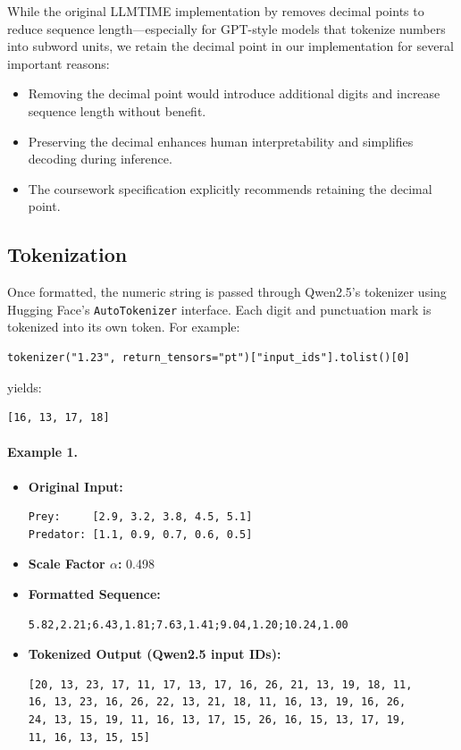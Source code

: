 \documentclass[a4paper,12pt]{article}
\begin{document}
While the original LLMTIME implementation by \citet{gruver2023language} removes decimal points to reduce sequence length—especially for GPT-style models that tokenize numbers into subword units, we retain the decimal point in our implementation for several important reasons:

\begin{itemize}
  \item Removing the decimal point would introduce additional digits and increase sequence length without benefit.
  \item Preserving the decimal enhances human interpretability and simplifies decoding during inference.
  \item The coursework specification explicitly recommends retaining the decimal point.
\end{itemize}

\subsection*{Tokenization}

Once formatted, the numeric string is passed through Qwen2.5’s tokenizer using Hugging Face’s \texttt{AutoTokenizer} interface. Each digit and punctuation mark is tokenized into its own token. For example:
\begin{verbatim}
tokenizer("1.23", return_tensors="pt")["input_ids"].tolist()[0]
\end{verbatim}
yields:
\begin{verbatim}
[16, 13, 17, 18]
\end{verbatim}

\paragraph{Example 1.}
\begin{itemize}
  \item \textbf{Original Input:}
  \begin{verbatim}
Prey:     [2.9, 3.2, 3.8, 4.5, 5.1]
Predator: [1.1, 0.9, 0.7, 0.6, 0.5]
  \end{verbatim}

  \vspace{-0.7cm}

  \item \textbf{Scale Factor $\alpha$:} 0.498


  \item \textbf{Formatted Sequence:}
  \begin{verbatim}
5.82,2.21;6.43,1.81;7.63,1.41;9.04,1.20;10.24,1.00
  \end{verbatim}

  \vspace{-0.7cm}

  \item \textbf{Tokenized Output (Qwen2.5 input IDs):}
  \begin{verbatim}
[20, 13, 23, 17, 11, 17, 13, 17, 16, 26, 21, 13, 19, 18, 11,
16, 13, 23, 16, 26, 22, 13, 21, 18, 11, 16, 13, 19, 16, 26,
24, 13, 15, 19, 11, 16, 13, 17, 15, 26, 16, 15, 13, 17, 19,
11, 16, 13, 15, 15]
  \end{verbatim}
\end{itemize}
\end{document}
